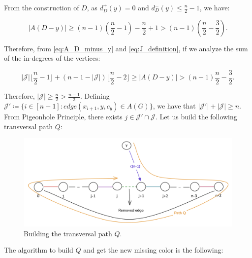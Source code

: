 From the construction of $D$, as $d^+_D(y) = 0$ and $d^-_D(y) \leq \frac{n}{2} - 1$, we have:

\begin{equation}
    |A(D - y)| \geq (n - 1) (\frac{n}{2} - 1) - \frac{n}{2} + 1 > (n - 1) (\frac{n}{2} - \frac{3}{2}).
    \label{eq:A_D_minus_y}
\end{equation}

Therefore, from \ref{eq:A_D_minus_y} and \ref{eq:J_definition}, if we analyze
the sum of the in-degrees of the vertices:

\begin{equation}
    |\mathcal{J}| \lfloor \frac{n}{2} - 1 \rfloor + (n - 1 - |\mathcal{J}|) \lfloor \frac{n}{2} - 2 \rfloor \geq |A(D - y)| > (n - 1) \frac{n}{2} - \frac{3}{2}.
\end{equation}

Therefore, $|\mathcal{J}| \geq \frac{n}{2} > \frac{n - 1}{2}$. Defining 
$\mathcal{J}' \coloneqq \{i \in [n - 1]: edge(x_{i+1}, y, c_y) \in A(G)\}$, we have that 
$|\mathcal{J}'| + |\mathcal{J}| \geq n$. From Pigeonhole Principle, there exists 
$j \in \mathcal{J}' \cap \mathcal{J}$. Let us build the following transversal path $Q$:

\begin{figure}[H]
    \centering
    \includegraphics[width=1\textwidth]{figuras/cycle_n-1_path_q.png}
    \caption{Building the transversal path $Q$.}
    \label{fig:cycle_n-1_path_q}
\end{figure}

The algorithm to build $Q$ and get the new missing color is the following:

